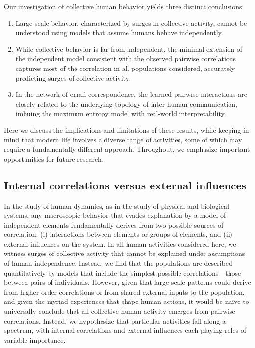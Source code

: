 \documentclass[aps,reprint,superscriptaddress,amsmath,amssymb,longbibliography]{revtex4-1}
\begin{document}
Our investigation of collective human behavior yields three distinct conclusions:
\begin{enumerate}
\item Large-scale behavior, characterized by surges in collective activity, cannot be understood using models that assume humans behave independently.
\item While collective behavior is far from independent, the minimal extension of the independent model consistent with the observed pairwise correlations captures most of the correlation in all populations considered, accurately predicting surges of collective activity.
\item In the network of email correspondence, the learned pairwise interactions are closely related to the underlying topology of inter-human communication, imbuing the maximum entropy model with real-world interpretability.
\end{enumerate}
Here we discuss the implications and limitations of these results, while keeping in mind that modern life involves a diverse range of activities, some of which may require a fundamentally different approach. Throughout, we emphasize important opportunities for future research.

\subsection{Internal correlations versus external influences}

In the study of human dynamics, as in the study of physical and biological systems, any macroscopic behavior that evades explanation by a model of independent elements fundamentally derives from two possible sources of correlation: (i) interactions between elements or groups of elements, and (ii) external influences on the system. In all human activities considered here, we witness surges of collective activity that cannot be explained under assumptions of human independence. Instead, we find that the populations are described quantitatively by models that include the simplest possible correlations---those between pairs of individuals. However, given that large-scale patterns could derive from higher-order correlations or from shared external inputs to the population, and given the myriad experiences that shape human actions, it would be na\"{i}ve to universally conclude that all collective human activity emerges from pairwise correlations. Instead, we hypothesize that particular activities fall along a spectrum, with internal correlations and external influences each playing roles of variable importance.
\end{document}
